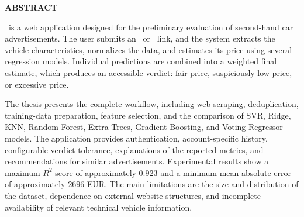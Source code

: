 \begin{center}
\begin{minipage}{0.86\textwidth}
    \begin{center}
        {\LARGE\bfseries ABSTRACT\par}
    \end{center}
    \vspace{5mm}

    \project\ is a web application designed for the preliminary evaluation of second-hand car advertisements. The user submits an \autovit\ or \mobilede\ link, and the system extracts the vehicle characteristics, normalizes the data, and estimates its price using several regression models. Individual predictions are combined into a weighted final estimate, which produces an accessible verdict: fair price, suspiciously low price, or excessive price.

    The thesis presents the complete workflow, including web scraping, deduplication, training-data preparation, feature selection, and the comparison of SVR, Ridge, KNN, Random Forest, Extra Trees, Gradient Boosting, and Voting Regressor models. The application provides authentication, account-specific history, configurable verdict tolerance, explanations of the reported metrics, and recommendations for similar advertisements. Experimental results show a maximum \(R^2\) score of approximately \(0.923\) and a minimum mean absolute error of approximately \(2696\) EUR. The main limitations are the size and distribution of the dataset, dependence on external website structures, and incomplete availability of relevant technical vehicle information.
\end{minipage}
\end{center}

\vspace*{\fill}
\clearpage

